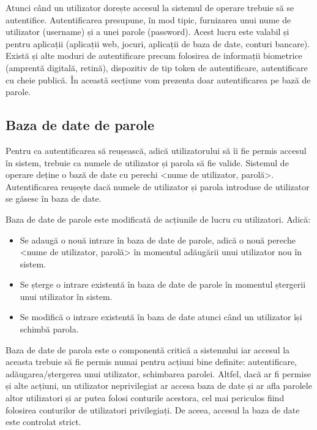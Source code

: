 Atunci când un utilizator dorește accesul la sistemul de operare trebuie să se
autentifice. Autentificarea presupune, în mod tipic, furnizarea unui nume de
utilizator (username) și a unei parole (password). Acest lucru este valabil și
pentru aplicații (aplicații web, jocuri, aplicații de baza de date, conturi
bancare). Există și alte moduri de autentificare precum folosirea de informații
biometrice (amprentă digitală, retină), dispozitiv de tip token de
autentificare, autentificare cu cheie publică. În această secțiune vom prezenta
doar autentificarea pe bază de parole.

\subsection{Baza de date de parole}
\label{sec:users-auth-pass}

Pentru ca autentificarea să reușească, adică utilizatorului să îi fie permis
accesul în sistem, trebuie ca numele de utilizator și parola să fie valide.
Sistemul de operare deține o bază de date cu perechi <nume de utilizator,
parolă>. Autentificarea reușește dacă numele de utilizator și parola introduse
de utilizator se găsesc în baza de date.

Baza de date de parole este modificată de acțiunile de lucru cu utilizatori. Adică:

\begin{itemize}
	\item Se adaugă o nouă intrare în baza de date de parole, adică o nouă
		pereche <nume de utilizator, parolă> în momentul adăugării unui
		utilizator nou în sistem.
	\item Se șterge o intrare existentă în baza de date de parole în
		momentul ștergerii unui utilizator în sistem.
	\item Se modifică o intrare existentă în baza de date atunci când un
		utilizator își schimbă parola.
\end{itemize}

Baza de date de parola este o componentă critică a sistemului iar accesul la
aceasta trebuie să fie permis numai pentru acțiuni bine definite: autentificare,
adăugarea/ștergerea unui utilizator, schimbarea parolei. Altfel, dacă ar fi
permise și alte acțiuni, un utilizator neprivilegiat ar accesa baza de date și
ar afla parolele altor utilizatori și ar putea folosi conturile acestora, cel
mai periculos fiind folosirea conturilor de utilizatori privilegiați. De aceea,
accesul la baza de date este controlat strict.

